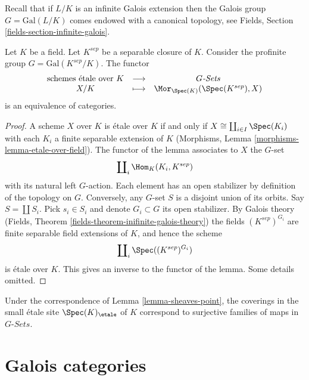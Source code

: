 \medskip\noindent
Recall that if $L/K$ is an infinite Galois extension then the
Galois group $G = \text{Gal}(L/K)$ comes endowed with a canonical
topology, see Fields, Section \ref{fields-section-infinite-galois}.

\begin{lemma}
\label{lemma-sheaves-point}
Let $K$ be a field. Let $K^{sep}$ be a separable closure of $K$.
Consider the profinite group $G = \text{Gal}(K^{sep}/K)$.
The functor
$$
\begin{matrix}
\text{schemes \'etale over }K &
\longrightarrow &
G\textit{-Sets} \\
X/K & \longmapsto &
\Mor_{\Spec(K)}(\Spec(K^{sep}), X)
\end{matrix}
$$
is an equivalence of categories.
\end{lemma}

\begin{proof}
A scheme $X$ over $K$ is \'etale over $K$ if and only if
$X \cong \coprod_{i\in I} \Spec(K_i)$ with
each $K_i$ a finite separable extension of $K$
(Morphisms, Lemma \ref{morphisms-lemma-etale-over-field}).
The functor of the lemma associates to $X$ the $G$-set
$$
\coprod\nolimits_i \Hom_K(K_i, K^{sep})
$$
with its natural left $G$-action. Each element has an open stabilizer
by definition of the topology on $G$. Conversely, any $G$-set $S$
is a disjoint union of its orbits. Say $S = \coprod S_i$. Pick $s_i \in S_i$
and denote $G_i \subset G$ its open stabilizer. By Galois theory
(Fields, Theorem \ref{fields-theorem-inifinite-galois-theory})
the fields $(K^{sep})^{G_i}$ are finite separable field extensions of $K$, and
hence the scheme
$$
\coprod\nolimits_i \Spec((K^{sep})^{G_i})
$$
is \'etale over $K$. This gives an inverse to the functor of the lemma.
Some details omitted.
\end{proof}

\begin{remark}
\label{remark-covering-surjective}
Under the correspondence of Lemma \ref{lemma-sheaves-point},
the coverings in the small \'etale site
$\Spec(K)_\etale$ of $K$ correspond to surjective families of
maps in $G\textit{-Sets}$.
\end{remark}









\section{Galois categories}
\label{section-galois}

